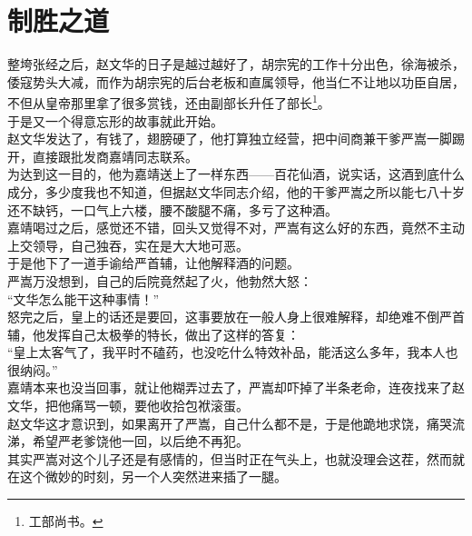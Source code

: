 \section{制胜之道}
\ifnum{}
	\begin{multicols}{\theparacolNo}
\fi
整垮张经之后，赵文华的日子是越过越好了，胡宗宪的工作十分出色，徐海被杀，倭寇势头大减，而作为胡宗宪的后台老板和直属领导，他当仁不让地以功臣自居，不但从皇帝那里拿了很多赏钱，还由副部长升任了部长\footnote{工部尚书。}。\\

于是又一个得意忘形的故事就此开始。\\

赵文华发达了，有钱了，翅膀硬了，他打算独立经营，把中间商兼干爹严嵩一脚踢开，直接跟批发商嘉靖同志联系。\\

为达到这一目的，他为嘉靖送上了一样东西——百花仙酒，说实话，这酒到底什么成分，多少度我也不知道，但据赵文华同志介绍，他的干爹严嵩之所以能七八十岁还不缺钙，一口气上六楼，腰不酸腿不痛，多亏了这种酒。\\

嘉靖喝过之后，感觉还不错，回头又觉得不对，严嵩有这么好的东西，竟然不主动上交领导，自己独吞，实在是大大地可恶。\\

于是他下了一道手谕给严首辅，让他解释酒的问题。\\

严嵩万没想到，自己的后院竟然起了火，他勃然大怒：\\

“文华怎么能干这种事情！”\\

怒完之后，皇上的话还是要回，这事要放在一般人身上很难解释，却绝难不倒严首辅，他发挥自己太极拳的特长，做出了这样的答复：\\

“皇上太客气了，我平时不磕药，也没吃什么特效补品，能活这么多年，我本人也很纳闷。”\\

嘉靖本来也没当回事，就让他糊弄过去了，严嵩却吓掉了半条老命，连夜找来了赵文华，把他痛骂一顿，要他收拾包袱滚蛋。\\

赵文华这才意识到，如果离开了严嵩，自己什么都不是，于是他跪地求饶，痛哭流涕，希望严老爹饶他一回，以后绝不再犯。\\

其实严嵩对这个儿子还是有感情的，但当时正在气头上，也就没理会这茬，然而就在这个微妙的时刻，另一个人突然进来插了一腿。\\


\end{multicols}
